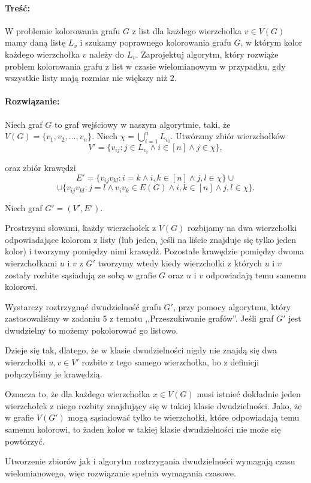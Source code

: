 \paragraph{Treść:} W problemie kolorowania grafu $G$ z list dla każdego wierzchołka 
$v \in V(G)$ mamy daną listę $L_v$ i
szukamy poprawnego kolorowania grafu $G$, w którym kolor każdego wierzchołka $v$ należy do $L_v$.
Zaprojektuj algorytm, który rozwiąże problem kolorowania grafu z list w czasie wielomianowym w przypadku, gdy
wszystkie listy mają rozmiar nie większy niż $2$.

\paragraph{Rozwiązanie:} 

Niech graf $G$ to graf wejściowy w naszym algorytmie, taki, że
$V(G) = \{v_1, v_2, \ldots, v_n\}$. 
Niech $\chi = \bigcup_{i = 1}^n L_{v_i}$.
Utwórzmy zbiór wierzchołków
\[V' = \{v_{ij} : j \in L_{v_i} \land i \in [n] \land j \in \chi\},\]

oraz zbiór krawędzi 
\[E' = \{v_{ij}v_{kl} : i = k \land i,k \in [n] \land j, l \in \chi\} \cup 
\]
\[\cup
\{v_{ij}v_{kl} : j = l \land v_iv_k \in E(G) \land i,k \in [n] \land j, l \in \chi\}.\]

Niech graf $G' = (V', E')$. 

Prostrzymi słowami, każdy wierzchołek z $V(G)$ rozbijamy na dwa wierzchołki odpowiadające kolorom z listy (lub jeden, jeśli na liście znajduje się tylko jeden kolor) i tworzymy pomiędzy 
nimi krawędź. Pozostałe krawędzie pomiędzy dwoma wierzchołkami
$u$ i $v$ z $G'$ tworzymy wtedy kiedy wierzchołki 
z których $u$ i $v$ zostały rozbite sąsiadują ze sobą
w grafie $G$ oraz $u$ i $v$ odpowiadają temu samemu kolorowi.

Wystarczy roztrzygnąć dwudzielność 
grafu $G'$, przy pomocy algorytmu, który zastosowaliśmy w zadaniu 5 z tematu ,,Przeszukiwanie grafów''. Jeśli graf $G'$ jest dwudzielny
to możemy pokolorować go listowo.

Dzieje się tak, dlatego, że w klasie dwudzielności nigdy
nie znajdą się dwa wierzchołki $u, v \in V'$ rozbite z tego samego wierzchołka, bo z definicji połączyliśmy je krawędzią.

Oznacza to, że dla każdego wierzchołka $x \in V(G)$ musi
istnieć dokładnie jeden wierzchołek z niego rozbity znajdujący się w takiej klasie dwudzielności. Jako, że w grafie $V(G')$
mogą sąsiadować tylko te wierzchołki, które odpowiadają temu samemu kolorowi, to żaden kolor w takiej klasie dwudzielności nie może się powtórzyć.

Utworzenie zbiorów jak i algorytm roztrzygania dwudzielności wymagają czasu wielomianowego, więc rozwiązanie spełnia wymagania czasowe.

